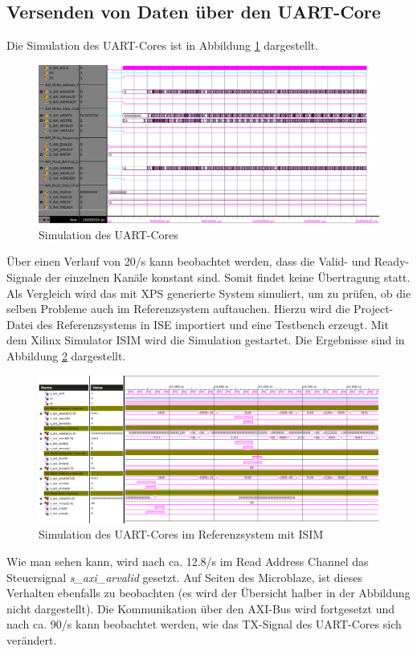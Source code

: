 \subsection{Versenden von Daten über den UART-Core}
Die Simulation des UART-Cores ist in Abbildung \ref{fig:UART_SIM} dargestellt.
\begin{figure}[th!]
\centering
\includegraphics[width=1\linewidth]{./bilder/UART_SIM}
\caption{Simulation des UART-Cores}
\label{fig:UART_SIM}
\end{figure}
Über einen Verlauf von 20\textmu/s kann beobachtet werden, dass die Valid- und Ready-Signale der einzelnen Kanäle konstant sind. Somit findet keine Übertragung statt. Als Vergleich wird das mit XPS generierte System simuliert, um zu prüfen, ob die selben Probleme auch im Referenzsystem auftauchen. Hierzu wird die Project-Datei des Referenzsystems in ISE importiert und eine Testbench erzeugt. Mit dem Xilinx Simulator ISIM wird die Simulation gestartet. Die Ergebnisse sind in Abbildung \ref{fig:UART_ISIM} dargestellt.
\begin{figure}[th!]
\centering
\includegraphics[width=1\linewidth]{./bilder/UART_ISIM}
\caption{Simulation des UART-Cores im Referenzsystem mit ISIM}
\label{fig:UART_ISIM}
\end{figure}
Wie man sehen kann, wird nach ca. 12.8\textmu/s im Read Address Channel das Steuersignal \textit{s\_axi\_arvalid} gesetzt. Auf Seiten des Microblaze, ist dieses Verhalten ebenfalls zu beobachten (es wird der Übersicht halber in der Abbildung nicht dargestellt). Die Kommunikation über den AXI-Bus wird fortgesetzt und nach ca. 90\textmu/s kann beobachtet werden, wie das TX-Signal des UART-Cores sich verändert.\\
